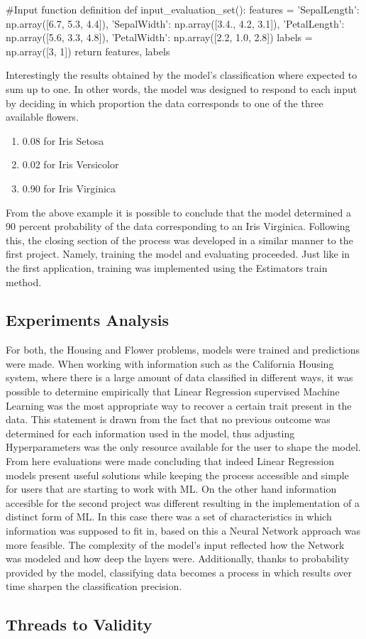 \begin{tensorflow}[caption={ads}]
#Input function definition
def input_evaluation_set():
    features = {'SepalLength': np.array([6.7, 5.3, 4.4]),
                'SepalWidth':  np.array([3.4., 4.2, 3.1]),
                'PetalLength': np.array([5.6, 3.3, 4.8]),
                'PetalWidth':  np.array([2.2, 1.0, 2.8])}
    labels = np.array([3, 1])
    return features, labels
\end{tensorflow}

Interestingly the results obtained by the model's classification where expected to sum up to one. In other words, the model was designed to respond to each input by deciding in which proportion the data corresponds to one of the three available flowers. 

\begin{enumerate}
 \item 0.08 for Iris Setosa
 \item 0.02 for Iris Versicolor
 \item 0.90 for Iris Virginica
\end{enumerate}

From the above example it is possible to conclude that the model determined a 90 percent probability of the data corresponding to an Iris Virginica.   Following this, the closing section of the process was developed in a similar manner to the first project. Namely, training the model and evaluating proceeded. Just like in the first  application, training was implemented using the Estimators train method. 

\subsection{Experiments Analysis}

For both, the Housing and Flower problems, models were trained and predictions were made. When working with information such as the California Housing system, where there is a large amount of data classified in different ways, it was possible to determine empirically that Linear Regression supervised Machine Learning was the most appropriate way to recover a certain trait present in the data. This statement is drawn from the fact that no previous outcome was determined for each information used in the model, thus adjusting Hyperparameters was the only resource available for the user to shape the model.  From here evaluations were made concluding that indeed Linear Regression models present useful solutions while keeping the process accessible and simple for users that are starting to work with \ac{ML}.  On the other hand information accesible for the second project was different resulting in the implementation of a distinct form of \ac{ML}. In this case there was a set of characteristics in which information was supposed to fit in, based on this a Neural Network approach was more feasible. The complexity of the model's input reflected how the Network was modeled and how deep the layers were. Additionally, thanks to probability provided by the model, classifying data becomes a process in which results over time sharpen the classification precision. 

\subsection{Threads to Validity}



\endinput




